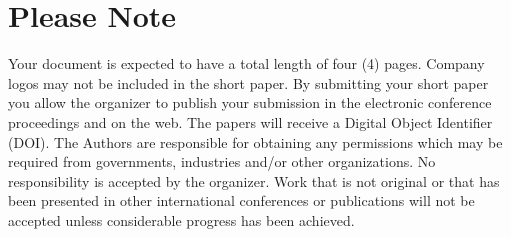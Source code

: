 \documentclass{ama}
\begin{document}
\section{Please Note}
Your document is expected to have a total length of four (4) pages.
Company logos may not be included in the short paper.
By submitting your short paper you allow the organizer to publish your submission in the electronic conference proceedings and on the web.
The papers will receive a Digital Object Identifier (DOI).
The Authors are responsible for obtaining any permissions which may be required from governments, industries and/or other organizations.
No responsibility is accepted by the organizer.
Work that is not original or that has been presented in other international conferences or publications will not be accepted unless considerable progress has been achieved.
\end{document}
